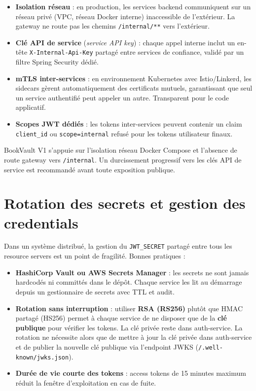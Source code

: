 \documentclass[12pt,a4paper]{report}
\begin{document}
\begin{itemize}
  \item \textbf{Isolation réseau} : en production, les services backend communiquent sur un réseau privé (VPC, réseau Docker interne) inaccessible de l'extérieur. La gateway ne route pas les chemins \texttt{/internal/**} vers l'extérieur.
  \item \textbf{Clé API de service} (\textit{service API key}) : chaque appel interne inclut un en-tête \texttt{X-Internal-Api-Key} partagé entre services de confiance, validé par un filtre Spring Security dédié.
  \item \textbf{mTLS inter-services} : en environnement Kubernetes avec Istio/Linkerd, les sidecars gèrent automatiquement des certificats mutuels, garantissant que seul un service authentifié peut appeler un autre. Transparent pour le code applicatif.
  \item \textbf{Scopes JWT dédiés} : les tokens inter-services peuvent contenir un claim \texttt{client\_id} ou \texttt{scope=internal} refusé pour les tokens utilisateur finaux.
\end{itemize}

BookVault V1 s'appuie sur l'isolation réseau Docker Compose et l'absence de route gateway vers \texttt{/internal}. Un durcissement progressif vers les clés API de service est recommandé avant toute exposition publique.

\section{Rotation des secrets et gestion des credentials}

Dans un système distribué, la gestion du \texttt{JWT\_SECRET} partagé entre tous les resource servers est un point de fragilité. Bonnes pratiques :

\begin{itemize}
  \item \textbf{HashiCorp Vault ou AWS Secrets Manager} : les secrets ne sont jamais hardcodés ni committés dans le dépôt. Chaque service les lit au démarrage depuis un gestionnaire de secrets avec TTL et audit.
  \item \textbf{Rotation sans interruption} : utiliser \textbf{RSA (RS256)} plutôt que HMAC partagé (HS256) permet à chaque service de ne disposer que de la \textbf{clé publique} pour vérifier les tokens. La clé privée reste dans auth-service. La rotation ne nécessite alors que de mettre à jour la clé privée dans auth-service et de publier la nouvelle clé publique via l'endpoint JWKS (\texttt{/.well-known/jwks.json}).
  \item \textbf{Durée de vie courte des tokens} : access tokens de 15 minutes maximum réduit la fenêtre d'exploitation en cas de fuite.
\end{itemize}
\end{document}
